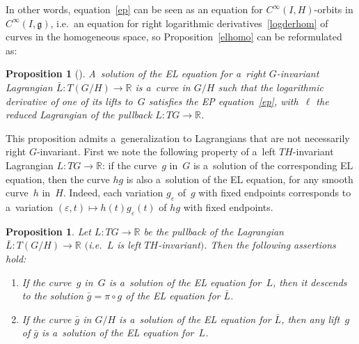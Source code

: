 \documentclass[10pt,a4paper]{amsart}
\numberwithin{equation}{section}
\newtheorem{Proposition}[Theorem]{Proposition}
{ \theoremstyle{definition}
\newtheorem{Example}[Theorem]{Example}
\newtheorem{Remark}[Theorem]{Remark} }
\begin{document}
In other words, equation~\eqref{ep} can be seen as an equation for $C^{\infty}(I,H)$-orbits in $C^{\infty}(I,\mathfrak g)$,
i.e.\ an equation for right logarithmic derivatives~\eqref{logderhom} of curves in the homogeneous space, so
Proposition~\ref{elhomo} can be reformulated as:

\begin{Proposition}[\cite{TV}]
A~solution of the EL equation for a~right $G$-invariant Lagrangian $\bar L:T(G/H)\to\mathbb R$ is a~curve in
$G/H$ such that the logarithmic derivative of one of its lifts to~$G$ satisfies the EP equation~\eqref{ep}, with~$\ell$
the reduced Lagrangian of the pullback $L:TG\to\mathbb R$.
\end{Proposition}

This proposition admits a~generalization to Lagrangians that are not necessarily right $G$-invariant.
First we note the following property of a~left $TH$-invariant Lagrangian $L:TG\to\mathbb R$: if the curve~$g$ in~$G$ is
a~solution of the corresponding EL equation, then the curve $hg$ is also a~solution of the EL equation, for any smooth
curve~$h$ in~$H$.
Indeed, each variation $g_\varepsilon$ of~$g$ with f\/ixed endpoints corresponds to a~variation $(\varepsilon,t)\mapsto
h(t)g_\varepsilon(t)$ of $hg$ with f\/ixed endpoints.

\begin{Proposition}
Let $L:TG\to\mathbb R$ be the pullback of the Lagrangian $\bar L:T(G/H)\to\mathbb R$ $($i.e.~$L$ is left $TH$-invariant$)$.
Then the following assertions hold:
\begin{enumerate}\itemsep=0pt
\item[$(i)$] If the curve~$g$ in~$G$ is a~solution of the EL equation for~$L$, then it descends to the solution $\bar g=\pi\circ
g$ of the EL equation for $\bar L$.
\item[$(ii)$] If the curve $\bar g$ in $G/H$ is a~solution of the EL equation for $\bar L$, then any lift~$g$ of $\bar g$ is
a~solution of the EL equation for~$L$.
\end{enumerate}
\end{Proposition}
\end{document}
